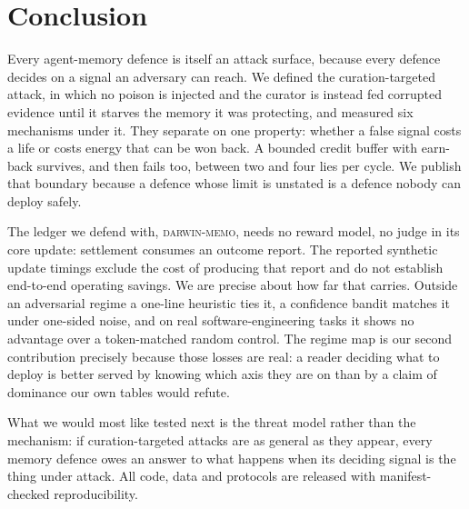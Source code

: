 \section{Conclusion}
\label{sec:conclusion}

Every agent-memory defence is itself an attack surface, because every
defence decides on a signal an adversary can reach. We defined the
curation-targeted attack, in which no poison is injected and the curator
is instead fed corrupted evidence until it starves the memory it was
protecting, and measured six mechanisms under it. They separate on one
property: whether a false signal costs a life or costs energy that can be
won back. A bounded credit buffer with earn-back survives, and then fails
too, between two and four lies per cycle. We publish that boundary
because a defence whose limit is unstated is a defence nobody can deploy
safely.

The ledger we defend with, \textsc{darwin-memo}, needs no reward model,
no judge in its core update: settlement consumes an outcome report.
The reported synthetic update timings exclude the cost of producing that
report and do not establish end-to-end operating savings. We are precise about how far that carries. Outside an
adversarial regime a one-line heuristic ties it, a confidence bandit
matches it under one-sided noise, and on real software-engineering tasks
it shows no advantage over a token-matched random control. The regime map
is our second contribution precisely because those losses are real: a
reader deciding what to deploy is better served by knowing which axis
they are on than by a claim of dominance our own tables would refute.

What we would most like tested next is the threat model rather than the
mechanism: if curation-targeted attacks are as general as they appear,
every memory defence owes an answer to what happens when its deciding
signal is the thing under attack. All code, data and protocols are
released with manifest-checked reproducibility.
